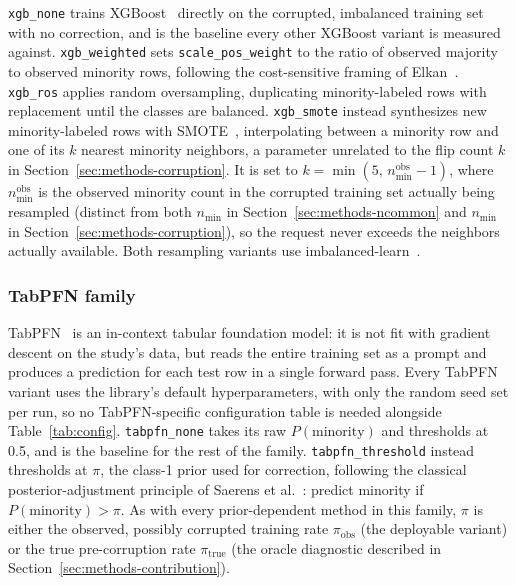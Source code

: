 \texttt{xgb\_none} trains XGBoost~\cite{chen2016xgboost} directly on the
corrupted, imbalanced training set with no correction, and is the baseline
every other XGBoost variant is measured against. \texttt{xgb\_weighted} sets
\texttt{scale\_pos\_weight} to the ratio of observed majority to observed
minority rows, following the cost-sensitive framing of
Elkan~\cite{elkan2001costsensitive}. \texttt{xgb\_ros} applies random
oversampling, duplicating minority-labeled rows with replacement until the
classes are balanced. \texttt{xgb\_smote} instead synthesizes new
minority-labeled rows with SMOTE~\cite{chawla2002smote}, interpolating
between a minority row and one of its $k$ nearest minority neighbors, a
parameter unrelated to the flip count $k$ in
Section~\ref{sec:methods-corruption}. It is set to
$k = \min(5,\, n_{\min}^{\text{obs}}-1)$, where $n_{\min}^{\text{obs}}$ is the
observed minority count in the corrupted training set actually being
resampled (distinct from both $n_{\min}$ in
Section~\ref{sec:methods-ncommon} and $n_{\min}$ in
Section~\ref{sec:methods-corruption}), so the request never exceeds the
neighbors actually available. Both resampling variants use
imbalanced-learn~\cite{lemaitre2017imbalancedlearn}.

\subsubsection{TabPFN family}

TabPFN~\cite{hollmann2023tabpfn,hollmann2025tabpfnv2} is an in-context tabular
foundation model: it is not fit with gradient descent on the study's data, but
reads the entire training set as a prompt and produces a prediction for each
test row in a single forward pass. Every TabPFN variant uses the library's
default hyperparameters, with only the random seed set per run, so no
TabPFN-specific configuration table is needed alongside
Table~\ref{tab:config}. \texttt{tabpfn\_none} takes its raw
$P(\text{minority})$ and thresholds at 0.5, and is the baseline for the rest
of the family. \texttt{tabpfn\_threshold} instead thresholds at $\pi$, the
class-1 prior used for correction, following the classical
posterior-adjustment principle of Saerens et al.~\cite{saerens2002adjusting}:
predict minority if $P(\text{minority}) > \pi$. As with every prior-dependent
method in this family, $\pi$ is either the observed, possibly corrupted
training rate $\pi_{\text{obs}}$ (the deployable variant) or the true
pre-corruption rate $\pi_{\text{true}}$ (the oracle diagnostic described in
Section~\ref{sec:methods-contribution}).

